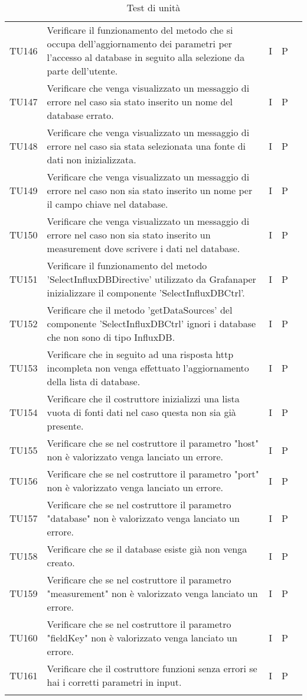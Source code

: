\begin{longtable} {
		>{}p{15mm} 
		>{}p{79.5mm}
		>{}p{15mm} 
		>{}p{15mm}
		>{}p{0mm}}
	TU146		& Verificare il funzionamento del metodo che si occupa dell'aggiornamento dei parametri per l'accesso al database in seguito alla selezione da parte dell'utente.& I & P &\TBstrut \\ [2mm]
	TU147		& Verificare che venga visualizzato un messaggio di errore nel caso sia stato inserito un nome del database errato.& I & P &\TBstrut \\ [2mm]
	TU148		& Verificare che venga visualizzato un messaggio di errore nel caso sia stata selezionata una fonte di dati non inizializzata.& I & P &\TBstrut \\ [2mm]
	TU149		& Verificare che venga visualizzato un messaggio di errore nel caso non sia stato inserito un nome per il campo chiave nel database.& I & P &\TBstrut \\ [2mm]
	TU150		& Verificare che venga visualizzato un messaggio di errore nel caso non sia stato inserito un measurement dove scrivere i dati nel database.& I & P &\TBstrut \\ [2mm]
	TU151		& Verificare il funzionamento del metodo 'SelectInfluxDBDirective' utilizzato da Grafana\glosp per inizializzare il componente 'SelectInfluxDBCtrl'.& I & P &\TBstrut \\ [2mm]
	TU152		& Verificare che il metodo 'getDataSources' del componente 'SelectInfluxDBCtrl' ignori i database che non sono di tipo InfluxDB.& I & P &\TBstrut \\ [2mm]
	TU153		& Verificare che in seguito ad una risposta http incompleta non venga effettuato l'aggiornamento della lista di database.& I & P &\TBstrut \\ [2mm]
	TU154		& Verificare che il costruttore inizializzi una lista vuota di fonti dati nel caso questa non sia già presente.& I & P &\TBstrut \\ [2mm]
	TU155		& Verificare che se nel costruttore il parametro "host" non è valorizzato venga lanciato un errore.& I & P &\TBstrut \\ [2mm]
	TU156		& Verificare che se nel costruttore il parametro "port" non è valorizzato venga lanciato un errore.& I & P &\TBstrut \\ [2mm]
	TU157		& Verificare che se nel costruttore il parametro "database" non è valorizzato venga lanciato un errore.& I & P &\TBstrut \\ [2mm]
	TU158		& Verificare che se il database esiste già non venga creato.& I & P &\TBstrut \\ [2mm]
	TU159		& Verificare che se nel costruttore il parametro "measurement" non è valorizzato venga lanciato un errore.& I & P &\TBstrut \\ [2mm]
	TU160		& Verificare che se nel costruttore il parametro "fieldKey" non è valorizzato venga lanciato un errore.& I & P &\TBstrut \\ [2mm]
	TU161		& Verificare che il costruttore funzioni senza errori se hai i corretti parametri in input.& I & P &\TBstrut \\ [2mm]
	
	
	\rowcolor{white}
	\caption{Test di unità}
\end{longtable}
